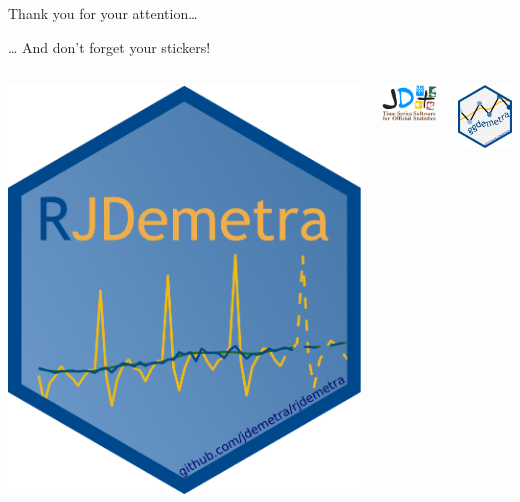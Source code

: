 \documentclass[10pt,xcolor=table,color={dvipsnames,usenames},ignorenonframetext,usepdftitle=false,french]{beamer}
\begin{document}
\begin{frame}{Thank you for your attention\ldots{}}
\protect\hypertarget{thank-you-for-your-attention}{}

\ldots{} And don't forget your stickers!

\bigskip

\begin{columns}
\begin{column}{0.33\textwidth}
\begin{center}
\includegraphics[width=\textwidth]{img/rjdemetra_logo.png}
\end{center}
\end{column}
\begin{column}{0.33\textwidth}
\begin{center}
\includegraphics[width=3cm]{img/jdemetra+.png}
\end{center}
\end{column}
\begin{column}{0.33\textwidth} 
\begin{center}
\includegraphics[width=3cm]{img/ggdemetra_logo.png}
\end{center}
\end{column}
\end{columns}


\end{frame}
\end{document}
